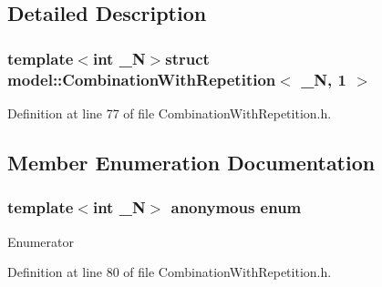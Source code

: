 \subsection{Detailed Description}
\subsubsection*{template$<$int \+\_\+\+N$>$struct model\+::\+Combination\+With\+Repetition$<$ \+\_\+\+N, 1 $>$}



Definition at line 77 of file Combination\+With\+Repetition.\+h.



\subsection{Member Enumeration Documentation}
\hypertarget{structmodel_1_1_combination_with_repetition_3_01___n_00_011_01_4_a0284171113915fd692564c4e2a06c224}{}\subsubsection[{anonymous enum}]{\setlength{\rightskip}{0pt plus 5cm}template$<$int \+\_\+\+N$>$ anonymous enum}\label{structmodel_1_1_combination_with_repetition_3_01___n_00_011_01_4_a0284171113915fd692564c4e2a06c224}
\begin{Desc}
\item[Enumerator]\par
\begin{description}
\item[{\em 
\hypertarget{structmodel_1_1_combination_with_repetition_3_01___n_00_011_01_4_a0284171113915fd692564c4e2a06c224af9de3f0e731d70a89b4012809014006a}{}N\label{structmodel_1_1_combination_with_repetition_3_01___n_00_011_01_4_a0284171113915fd692564c4e2a06c224af9de3f0e731d70a89b4012809014006a}
}]\end{description}
\end{Desc}


Definition at line 80 of file Combination\+With\+Repetition.\+h.

